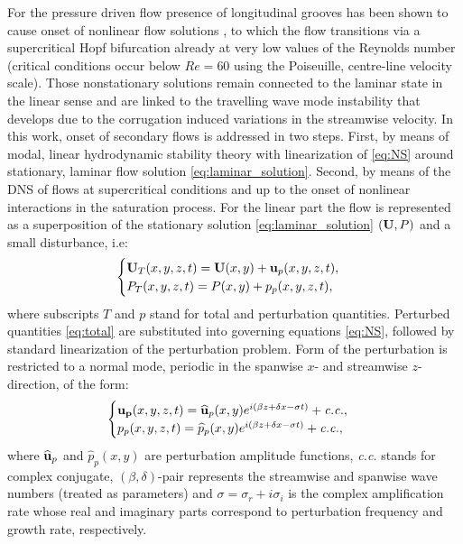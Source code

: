 \documentclass[lineno]{jfm}
\begin{document}
For the pressure driven flow presence of longitudinal grooves has been shown to cause onset of nonlinear flow solutions \citep{Nikesh2017,Nikesh2018,moradi2019flow}, to which the flow transitions via a supercritical Hopf bifurcation \citep{Gepner2020} already at very low values of the Reynolds number (critical conditions occur below $Re=60$ using the Poiseuille, centre-line velocity scale).
Those nonstationary solutions remain connected to the laminar state in the linear sense and are linked to the travelling wave mode instability that develops due to the corrugation induced variations in the streamwise velocity.
In this work, onset of secondary flows is addressed in two steps.
First, by means of modal, linear hydrodynamic stability theory with linearization of \eqref{eq:NS} around stationary, laminar flow solution \eqref{eq:laminar_solution}.
Second, by means of the DNS of flows at supercritical conditions and up to the onset of nonlinear interactions in the saturation process. 
For the linear part the flow is represented as a superposition of the stationary solution \eqref{eq:laminar_solution} $({\bf U}, P)$ and a small disturbance, i.e:
\begin{equation}
    \begin{cases}
        {\bf U}_T(x,y,z,t)={\bf U}(x,y)+{\bf u}_p(x,y,z,t), \\
        P_T(x,y,z,t)      = P(x,y)+p_p(x,y,z,t),
    \end{cases}
    \label{eq:total}
\end{equation}
where subscripts $T$ and $p$ stand for total and perturbation quantities.
Perturbed quantities \eqref{eq:total} are substituted into governing equations \eqref{eq:NS}, followed by standard linearization of the perturbation problem.
Form of the perturbation is restricted to a normal mode, periodic in the spanwise $x$- and streamwise $z$-direction, of the form:
\begin{equation}
    \begin{cases}
        {\bf u_p}(x,y,z,t)={\bf \widehat{u}}_p(x,y)e^{i(\beta z + \delta x - \sigma t)}+{\it c.c.}, \\
        p_p(x,y,z,t) = \widehat{p}_p(x,y)e^{i(\beta z + \delta x - \sigma t)}+{\it c.c.},
    \end{cases}
    \label{eq:normal_mode}
\end{equation}
where ${\bf \widehat{u}}_p$ and $\widehat{p}_p(x,y)$ are perturbation amplitude functions, \textit{c.c.} stands for complex conjugate, $(\beta, \delta)$-pair represents the streamwise and spanwise wave numbers (treated as parameters) and $\sigma=\sigma_r+i\sigma_i$ is the complex amplification rate whose real and imaginary parts correspond to perturbation frequency and growth rate, respectively.
\end{document}
